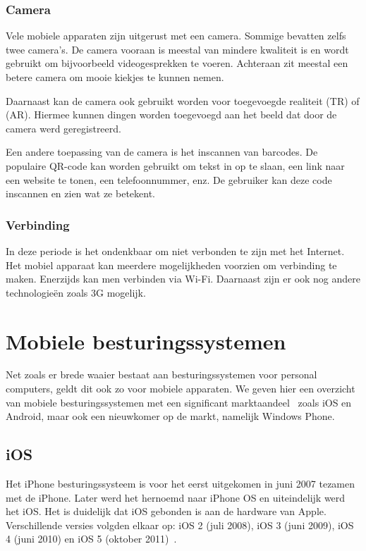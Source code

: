 \subsubsection{Camera}
Vele mobiele apparaten zijn uitgerust met een camera. Sommige bevatten zelfs twee camera's. De camera vooraan is meestal van mindere kwaliteit is en wordt gebruikt om bijvoorbeeld videogesprekken te voeren. Achteraan zit meestal een betere camera om mooie kiekjes te kunnen nemen.

Daarnaast kan de camera ook gebruikt worden voor toegevoegde realiteit (TR) of   (AR). Hiermee kunnen dingen worden toegevoegd aan het beeld dat door de camera werd geregistreerd.

Een andere toepassing van de camera is het inscannen van barcodes. De populaire QR-code kan worden gebruikt om tekst in op te slaan, een link naar een website te tonen, een telefoonnummer, enz. De gebruiker kan deze code inscannen en zien wat ze betekent.

\subsubsection{Verbinding}
In deze periode is het ondenkbaar om niet verbonden te zijn met het Internet. Het mobiel apparaat kan meerdere mogelijkheden voorzien om verbinding te maken. Enerzijds kan men verbinden via Wi-Fi. Daarnaast zijn er ook nog andere technologieën zoals 3G mogelijk.


\section{Mobiele besturingssystemen}
\label{sec:mobiele-besturingssystemen}
Net zoals er brede waaier bestaat aan besturingssystemen voor personal computers, geldt dit ook zo voor mobiele apparaten. We geven hier een overzicht van mobiele besturingssystemen met een significant marktaandeel~\cite{David2011, Hales2012} zoals iOS en Android, maar ook een nieuwkomer op de markt, namelijk Windows Phone.

\subsection{iOS}
Het iPhone besturingssysteem is voor het eerst uitgekomen in juni 2007 tezamen met de iPhone. Later werd het hernoemd naar iPhone OS en uiteindelijk werd het iOS. Het is duidelijk dat iOS gebonden is aan de hardware van Apple. Verschillende versies volgden elkaar op: iOS 2 (juli 2008), iOS 3 (juni 2009), iOS 4 (juni 2010) en iOS 5 (oktober 2011)~\cite{Deitel2012, PhilDutson2012}. 

